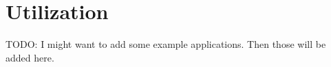 \section{Utilization}
\label{sec:implementation:utilization}

\begin{note}
  TODO: I might want to add some example applications. 
  Then those will be added here. 
\end{note}




